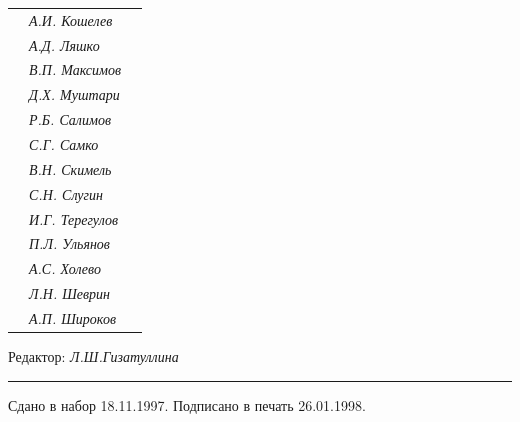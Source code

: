 \begin{tabular}{p{63mm}p{40mm}p{50mm}}
                               &   \it А.И. Кошелев  & \\


                               &   \it А.Д. Ляшко  & \\


                               &   \it В.П. Максимов  & \\


                               &   \it Д.Х. Муштари & \\


                               &   \it Р.Б. Салимов  & \\


                               &   \it С.Г. Самко  & \\


                               &   \it В.Н. Скимель &  \\


                               &   \it С.Н. Слугин  & \\


                               &   \it И.Г. Терегулов  & \\


                               &   \it П.Л. Ульянов  & \\


                               &   \it А.С. Холево  & \\


                               &   \it Л.Н. Шеврин  & \\


                               &   \it А.П. Широков & \\


\end{tabular} 


\bigskip 


\bigskip 


\bigskip 





 


\centerline{Редактор: \it Л.Ш.Гизатуллина}


\bigskip 


\hrule 


\setlength{\hoffset}{-23mm}


\bigskip


\noindent Сдано в набор 18.11.1997. Подписано в печать 26.01.1998.


